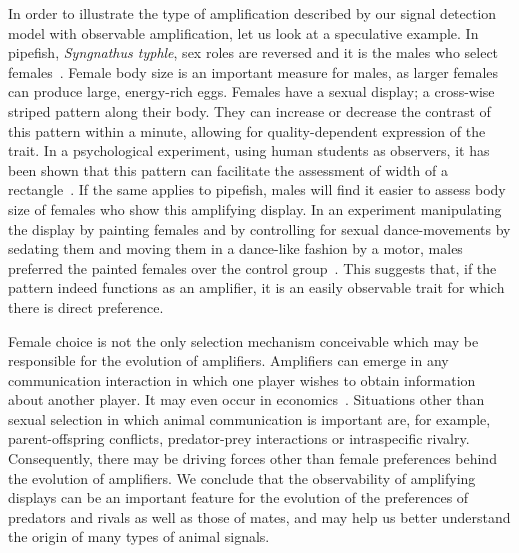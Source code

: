 \documentclass[a4paper,12pt]{article}
\numberwithin{equation}{section}
\numberwithin{figure}{section}
\begin{document}
In order to illustrate the type of amplification described by our signal detection model with observable amplification, let us look at a speculative example. In pipefish, \textit{Syngnathus typhle}, sex roles are reversed and it is the males who select females~\cite{Berglund2000}. Female body size is an important measure for males, as larger females can produce large, energy-rich eggs. Females have a sexual display; a cross-wise striped pattern along their body. They can increase or decrease the contrast of this pattern within a minute, allowing for quality-dependent expression of the trait. In a psychological experiment, using human students as observers, it has been shown that this pattern can facilitate the assessment of width of a rectangle~\cite{Berglund2000}. If the same applies to pipefish, males will find it easier to assess body size of females who show this amplifying display. In an experiment manipulating the display by painting females and by controlling for sexual dance-movements by sedating them and moving them in a dance-like fashion by a motor, males preferred the painted females over the control group~\cite{Berglund2001}. This suggests that, if the pattern indeed functions as an amplifier, it is an easily observable trait for which there is direct preference.

\enlargethispage{7mm}

Female choice is not the only selection mechanism conceivable which may be responsible for the evolution of amplifiers. Amplifiers can emerge in any communication interaction in which one player wishes to obtain information about another player. It may even occur in economics~\cite{Bogaardt2016a}. Situations other than sexual selection in which animal communication is important are, for example, parent-offspring conflicts, predator-prey interactions or intraspecific rivalry. Consequently, there may be driving forces other than female preferences behind the evolution of amplifiers. We conclude that the observability of amplifying displays can be an important feature for the evolution of the preferences of predators and rivals as well as those of mates, and may help us better understand the origin of many types of animal signals.

\newpage


\label{sec:Bibliography}
\renewcommand{\refname}{Bibliography}



\newpage
\end{document}
